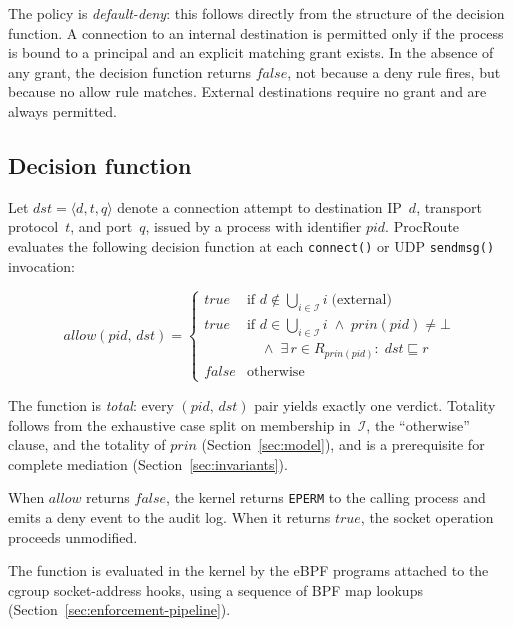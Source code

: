 \documentclass[sigconf]{acmart}
\begin{document}
The policy is \emph{default-deny}: this follows directly from the
structure of the decision function.
A connection to an internal destination is permitted only if the
process is bound to a principal and an explicit matching grant
exists.  In the absence of any grant, the decision function
returns $\mathit{false}$, not because a deny rule fires, but
because no allow rule matches.
External destinations require no grant and are always permitted.

\subsection{Decision function}
\label{sec:decision}

Let $\mathit{dst} = \langle d, t, q \rangle$ denote a connection
attempt to destination IP~$d$, transport protocol~$t$, and
port~$q$, issued by a process with identifier $\mathit{pid}$.
ProcRoute evaluates the following decision function at each
\texttt{connect()} or UDP \texttt{sendmsg()} invocation:

\[
  \mathit{allow}(\mathit{pid},\, \mathit{dst}) =
  \begin{cases}
    \mathit{true}
      & \text{if } d \notin \bigcup_{i \in \mathcal{I}} i
        \;\text{(external)}\\[4pt]
    \mathit{true}
      & \text{if } d \in \bigcup_{i \in \mathcal{I}} i
        \;\land\; \mathit{prin}(\mathit{pid}) \neq \bot \\
      & \quad \land\; \exists\, r \in R_{\mathit{prin}(\mathit{pid})}
              :\; \mathit{dst} \sqsubseteq r \\[4pt]
    \mathit{false}
      & \text{otherwise}
  \end{cases}
\]

The function is \emph{total}: every $(\mathit{pid},\, \mathit{dst})$
pair yields exactly one verdict.
Totality follows from the exhaustive case split on membership
in~$\mathcal{I}$, the ``otherwise'' clause, and the totality of
$\mathit{prin}$ (Section~\ref{sec:model}), and is a prerequisite
for complete mediation (Section~\ref{sec:invariants}).

When $\mathit{allow}$ returns $\mathit{false}$, the kernel returns
\texttt{EPERM} to the calling process and emits a deny event to the
audit log.  When it returns $\mathit{true}$, the socket operation
proceeds unmodified.

The function is evaluated in the kernel by the eBPF programs
attached to the cgroup socket-address hooks, using a sequence of
BPF map lookups (Section~\ref{sec:enforcement-pipeline}).
\end{document}
